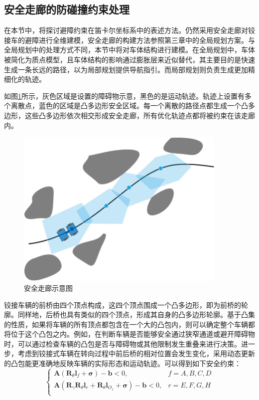 \documentclass[master,academic]{ysuthesis} %
\begin{document}
		\subsection{安全走廊的防碰撞约束处理}
		在本节中，将探讨避障约束在笛卡尔坐标系中的表述方法。仍然采用安全走廊对铰接车的避障进行全维建模，安全走廊的构建方法参照第三章中的全局规划方案。与全局规划中的处理方式不同，本节中将对车体结构进行建模。在全局规划中，车体被简化为质点模型，且车体结构的影响通过膨胀层来近似替代，其主要目的是快速生成一条长远的路径，以为局部规划提供导航指引。而局部规划则负责生成更加精细化的轨迹。

		如图\ref{fig:安全走廊}所示，灰色区域是设置的障碍物示意，黑色的是运动轨迹。轨迹上设置有多个离散点，蓝色的区域是凸多边形安全区域。每一个离散的路径点都生成一个凸多边形，这些凸多边形依次相交形成安全走廊，所有优化轨迹点都将被约束在该走廊内。
		\begin{figure}[H]
			\centering
			\includegraphics[width=0.9\textwidth]{安全走廊.png}
			\caption{安全走廊示意图}
			\label{fig:安全走廊}
		\end{figure}

		铰接车辆的前桥由四个顶点构成，这四个顶点围成一个凸多边形，即为前桥的轮廓。同样地，后桥也具有类似的四个顶点，形成其自身的凸多边形轮廓。基于凸集的性质，如果将车辆的所有顶点都包含在一个大的凸包内，则可以确定整个车辆都将位于这个凸包之内。例如，在判断车辆是否能够安全通过狭窄通道或避开障碍物时，可以通过检查车辆的凸包是否与障碍物或其他限制发生重叠来进行决策。进一步，考虑到铰接式车辆在转向过程中前后桥的相对位置会发生变化，采用动态更新的凸包能更准确地反映车辆的实际形态和运动轨迹。可以得到如下安全约束：
		\begin{equation}
			\left\{ \begin{matrix}
				\bm{A}\left( \bm{R}_{\theta}\bm{l}_f+\bm{\sigma} \right) -\bm{b}<0,&		f=A,B,C,D\\
				\bm{A}\left( \bm{R}_{\gamma}\bm{R}_{\theta}\bm{l}_r+\bm{R}_{\theta}\bm{l}_{O_1}+\bm{\sigma} \right) -\bm{b}<0,&		r=E,F,G,H\\
			\end{matrix} \right. 
		\end{equation}
\end{document}
